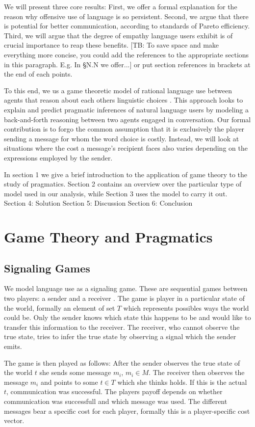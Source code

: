 \documentclass[10pt]{article}
\newcommand{\tb}[1]{\textcolor[rgb]{.8,.33,.0}{[TB: #1]}}%
\begin{document}
We will present three core results: First, we offer a formal explanation for the reason why offensive use of language is so persistent. Second, we argue that there is potential for better communication, according to standards of Pareto efficiency. Third, we will argue that the degree of empathy language users exhibit is of crucial importance to reap these benefits. \tb{To save space and make everything more concise, you could add the references to the appropriate sections in this paragraph. E.g. In \S N.N we offer...} or put section references in brackets at the end of each points.

To this end, we us a game theoretic model of rational language use between agents that reason about each others linguistic choices \cite{franke2014pragmatic}. This approach looks to explain and predict pragmatic inferences of natural language users by modeling a back-and-forth reasoning between two agents engaged in conversation.
Our formal contribution is to forgo the common assumption that it is exclusively the player sending a message for whom the word choice is costly. Instead, we will look at situations where the cost a message's recipient faces also varies depending on the expressions employed by the sender.

In section 1 we give a brief introduction to the application of game theory to the study of pragmatics.
Section 2 contains an overview over the particular type of model used in our analysis, while Section 3 uses the model to carry it out.
Section 4: Solution
Section 5: Discussion
Section 6: Conclusion

\section{Game Theory and Pragmatics}
\subsection{Signaling Games}
We model language use as a signaling game. These are sequential games between two players: a sender and a receiver \cite{david1969convention}. The game is player in a particular state of the world, formally an element of set $T$ which represents possibles ways the world could be. Only the sender knows which state this happens to be and would like to transfer this information to the receiver. The receiver, who cannot observe the true state, tries to infer the true state by observing a signal which the sender emits.

The game is then played as follows: After the sender observes the true state of the world $t$ she sends some message $m_i$,  $m_i \in M$.
The receiver then observes the message $m_i$ and points to some $t\in T$ which she thinks holds. If this is the actual $t$, communication was successful.
The players payoff depends on whether communication was successfull and which message was used. The different messages bear a specific cost for each player, formally this is a player-specific cost vector.
\end{document}
